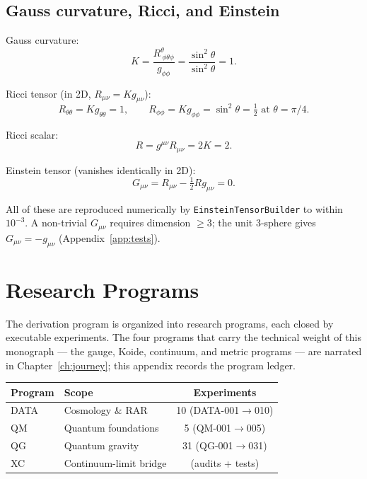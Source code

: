 \documentclass[10pt,twoside,openany]{book}
\begin{document}
\section{Gauss curvature, Ricci, and Einstein}

Gauss curvature:
\begin{equation}
K = \frac{R^\theta_{\ \phi\theta\phi}}{g_{\phi\phi}}
= \frac{\sin^2\theta}{\sin^2\theta} = 1.
\end{equation}

Ricci tensor (in 2D, $R_{\mu\nu}=K g_{\mu\nu}$):
\begin{equation}
R_{\theta\theta}=K g_{\theta\theta}=1,\qquad
R_{\phi\phi}=K g_{\phi\phi}=\sin^2\theta=\tfrac12 \text{ at }\theta=\pi/4.
\end{equation}

Ricci scalar:
\begin{equation}
R = g^{\mu\nu}R_{\mu\nu} = 2K = 2.
\end{equation}

Einstein tensor (vanishes identically in 2D):
\begin{equation}
G_{\mu\nu} = R_{\mu\nu} - \tfrac12 R g_{\mu\nu} = 0.
\end{equation}

All of these are reproduced numerically by \texttt{EinsteinTensorBuilder} to within
$10^{-3}$. A non-trivial $G_{\mu\nu}$ requires dimension $\ge3$; the unit 3-sphere gives
$G_{\mu\nu}=-g_{\mu\nu}$ (Appendix~\ref{app:tests}).


\chapter{Research Programs}
\label{app:programs}

The derivation program is organized into research programs, each closed by executable
experiments. The four programs that carry the technical weight of this monograph --- the
gauge, Koide, continuum, and metric programs --- are narrated in
Chapter~\ref{ch:journey}; this appendix records the program ledger.

\begin{center}
\begin{tabular}{llc}
\toprule
Program & Scope & Experiments \\
\midrule
DATA & Cosmology \& RAR & 10 (DATA-001$\to$010) \\
QM & Quantum foundations & 5 (QM-001$\to$005) \\
QG & Quantum gravity & 31 (QG-001$\to$031) \\
XC & Continuum-limit bridge & (audits + tests) \\
\bottomrule
\end{tabular}
\end{center}
\end{document}
